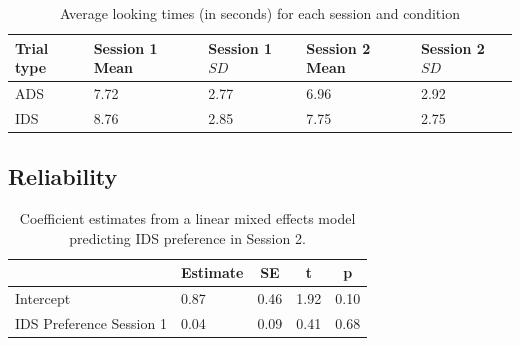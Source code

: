 \documentclass[
  man,floatsintext]{apa6}
\begin{document}
\begin{table}[tbp]

\begin{center}
\begin{threeparttable}

\caption{\label{tab:descriptives_table1}Average looking times (in seconds) for each session and condition}

\begin{tabular}{lllll}
\toprule
Trial type & Session 1 Mean & Session 1 $SD$ & Session 2 Mean & Session 2 $SD$\\
\midrule
ADS & 7.72 & 2.77 & 6.96 & 2.92\\
IDS & 8.76 & 2.85 & 7.75 & 2.75\\
\bottomrule
\end{tabular}

\end{threeparttable}
\end{center}

\end{table}

\hypertarget{reliability}{%
\subsection{Reliability}\label{reliability}}

\begin{table}[tbp]

\begin{center}
\begin{threeparttable}

\caption{\label{tab:coef_table2}Coefficient estimates from a linear mixed effects model predicting IDS preference in Session 2.}

\begin{tabular}{lllll}
\toprule
 & \multicolumn{1}{c}{Estimate} & \multicolumn{1}{c}{SE} & \multicolumn{1}{c}{t} & \multicolumn{1}{c}{p}\\
\midrule
Intercept & 0.87 & 0.46 & 1.92 & 0.10\\
IDS Preference Session 1 & 0.04 & 0.09 & 0.41 & 0.68\\
\bottomrule
\end{tabular}

\end{threeparttable}
\end{center}

\end{table}
\end{document}
